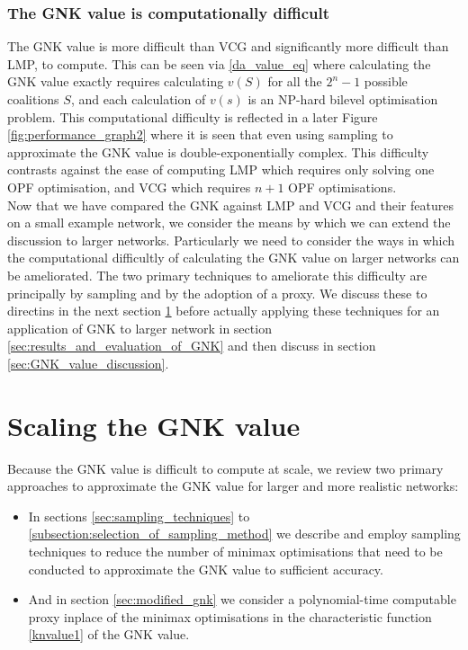 \subsubsection*{The GNK value is computationally difficult}
The GNK value is more difficult than VCG and significantly more difficult than LMP, to compute.
This can be seen via \eqref{da_value_eq} where calculating the GNK value exactly requires calculating $v(S)$ for all the $2^n-1$ possible coalitions $S$, and each calculation of $v(s)$ is an NP-hard bilevel optimisation problem.
This computational difficulty is reflected in a later Figure \ref{fig:performance_graph2} where it is seen that even using sampling to approximate the GNK value is double-exponentially complex. 
This difficulty contrasts against the ease of computing LMP which requires only solving one OPF optimisation, and VCG which requires $n+1$ OPF optimisations.\\

Now that we have compared the GNK against LMP and VCG and their features on a small example network, we consider the means by which we can extend the discussion to larger networks.
Particularly we need to consider the ways in which the computational difficultly of calculating the GNK value on larger networks can be ameliorated.
The two primary techniques to ameliorate this difficulty are principally by sampling and by the adoption of a proxy. We discuss these to directins in the next section \ref{sec:scaling} before actually applying these techniques for an application of GNK to larger network in section \ref{sec:results_and_evaluation_of_GNK} and then discuss in section \ref{sec:GNK_value_discussion}.

\section{Scaling the GNK value}\label{sec:scaling}

Because the GNK value is difficult to compute at scale, we review two primary approaches to approximate the GNK value for larger and more realistic networks:

\begin{itemize}
    \item In sections \ref{sec:sampling_techniques} to \ref{subsection:selection_of_sampling_method} we describe and employ sampling techniques to reduce the number of minimax optimisations that need to be conducted to approximate the GNK value to sufficient accuracy.
    \item And in section \ref{sec:modified_gnk} we consider a polynomial-time computable proxy inplace of the minimax optimisations in the characteristic function \eqref{knvalue1} of the GNK value.
\end{itemize}

